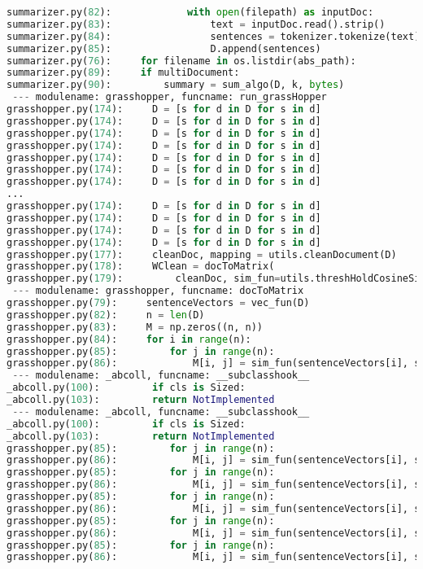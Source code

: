 \documentclass[11pt]{article}
\begin{document}
\begin{lstlisting}[language=Python]
summarizer.py(82):             with open(filepath) as inputDoc:
summarizer.py(83):                 text = inputDoc.read().strip()
summarizer.py(84):                 sentences = tokenizer.tokenize(text)
summarizer.py(85):                 D.append(sentences)
summarizer.py(76):     for filename in os.listdir(abs_path):
summarizer.py(89):     if multiDocument:
summarizer.py(90):         summary = sum_algo(D, k, bytes)
 --- modulename: grasshopper, funcname: run_grassHopper
grasshopper.py(174):     D = [s for d in D for s in d]
grasshopper.py(174):     D = [s for d in D for s in d]
grasshopper.py(174):     D = [s for d in D for s in d]
grasshopper.py(174):     D = [s for d in D for s in d]
grasshopper.py(174):     D = [s for d in D for s in d]
grasshopper.py(174):     D = [s for d in D for s in d]
grasshopper.py(174):     D = [s for d in D for s in d]
...
grasshopper.py(174):     D = [s for d in D for s in d]
grasshopper.py(174):     D = [s for d in D for s in d]
grasshopper.py(174):     D = [s for d in D for s in d]
grasshopper.py(174):     D = [s for d in D for s in d]
grasshopper.py(177):     cleanDoc, mapping = utils.cleanDocument(D)
grasshopper.py(178):     WClean = docToMatrix(
grasshopper.py(179):         cleanDoc, sim_fun=utils.threshHoldCosineSim)
 --- modulename: grasshopper, funcname: docToMatrix
grasshopper.py(79):     sentenceVectors = vec_fun(D)
grasshopper.py(82):     n = len(D)
grasshopper.py(83):     M = np.zeros((n, n))
grasshopper.py(84):     for i in range(n):
grasshopper.py(85):         for j in range(n):
grasshopper.py(86):             M[i, j] = sim_fun(sentenceVectors[i], sentenceVectors[j])
 --- modulename: _abcoll, funcname: __subclasshook__
_abcoll.py(100):         if cls is Sized:
_abcoll.py(103):         return NotImplemented
 --- modulename: _abcoll, funcname: __subclasshook__
_abcoll.py(100):         if cls is Sized:
_abcoll.py(103):         return NotImplemented
grasshopper.py(85):         for j in range(n):
grasshopper.py(86):             M[i, j] = sim_fun(sentenceVectors[i], sentenceVectors[j])
grasshopper.py(85):         for j in range(n):
grasshopper.py(86):             M[i, j] = sim_fun(sentenceVectors[i], sentenceVectors[j])
grasshopper.py(85):         for j in range(n):
grasshopper.py(86):             M[i, j] = sim_fun(sentenceVectors[i], sentenceVectors[j])
grasshopper.py(85):         for j in range(n):
grasshopper.py(86):             M[i, j] = sim_fun(sentenceVectors[i], sentenceVectors[j])
grasshopper.py(85):         for j in range(n):
grasshopper.py(86):             M[i, j] = sim_fun(sentenceVectors[i], sentenceVectors[j])

\end{lstlisting}
\end{document}
